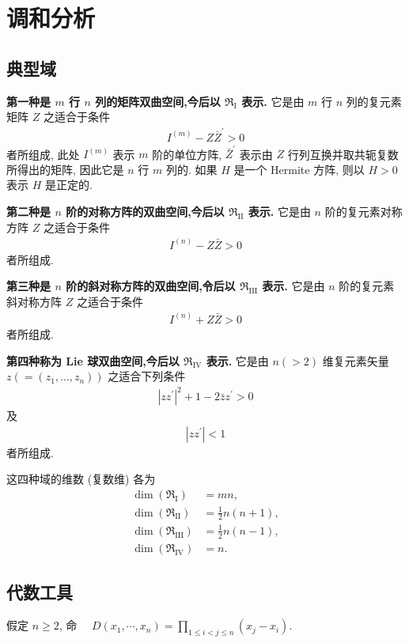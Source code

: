\chapter{调和分析}
\section{典型域}
\textbf{第一种是 $m$ 行 $n$ 列的矩阵双曲空间,今后以 $\mathfrak{R} _{\mathrm{I}}$ 表示.} 它是由 $m$ 行 $n$ 列的复元素矩阵 $Z$ 之适合于条件
\begin{align*}
I^{(m)}-Z \bar{Z}^{\prime}>0
\end{align*}
者所组成, 此处 $I^{(m)}$ 表示 $m$ 阶的单位方阵, $\bar{Z}^{\prime}$ 表示由 $Z$ 行列互换并取共轭复数所得出的矩阵, 因此它是 $n$ 行 $m$ 列的. 如果 $H$ 是一个 Hermite 方阵, 则以 $H>0$ 表示 $H$ 是正定的.

\textbf{第二种是 $n$ 阶的对称方阵的双曲空间,今后以 $\mathfrak{R} _{\mathrm{II}}$ 表示.} 它是由 $n$ 阶的复元素对称方阵 $Z$ 之适合于条件
\begin{align*}
I^{(n)}-Z \bar{Z}>0
\end{align*}
者所组成.

\textbf{第三种是 $n$ 阶的斜对称方阵的双曲空间,令后以 $\mathfrak{R} _{\mathrm{III}}$ 表示.} 它是由 $n$ 阶的复元素斜对称方阵 $Z$ 之适合于条件
\begin{align*}
I^{(n)}+Z \bar{Z}>0
\end{align*}
者所组成.

\textbf{第四种称为 Lie 球双曲空间,今后以 $\mathfrak{R} _{\mathrm{IV}}$ 表示.} 它是由 $n(>2)$ 维复元素矢量 $z\left(=\left(z_1, \ldots, z_n\right)\right)$ 之适合下列条件
\begin{align*}
\left|z z^{\prime}\right|^2+1-2 \bar{z} z^{\prime}>0
\end{align*}
及
\begin{align*}
\left|z z^{\prime}\right|<1
\end{align*}
者所组成.

这四种域的维数 (复数维) 各为 
\begin{align*}
    \dim(\mathfrak{R}_{\mathrm{I}})&=mn,\\ 
    \dim(\mathfrak{R}_{\mathrm{II}})&=\frac{1}{2} n(n+1), \\
    \dim(\mathfrak{R}_{\mathrm{III}})&=\frac{1}{2} n(n-1), \\
    \dim(\mathfrak{R}_{\mathrm{IV}})&=n.
\end{align*}

\section{代数工具}
假定 $n \geqslant 2$, 命 $\quad D\left(x_1, \cdots, x_n\right)=\prod_{1\leqslant i<j\leqslant n}\left(x_j-x_i\right)$.

